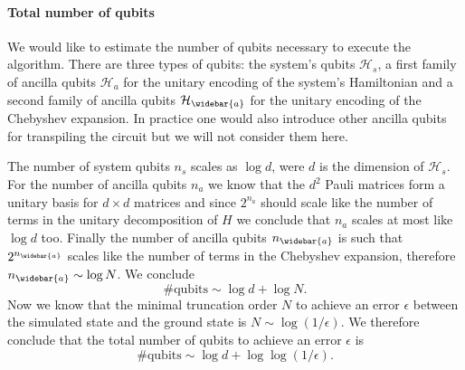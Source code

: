 \documentclass[a4paper,11pt]{article}
\begin{document}
\paragraph{Total number of qubits} We would like to estimate the number of qubits necessary to execute the algorithm. There are three types of qubits: the system's qubits $\mathcal{H}_s$, a first family of ancilla qubits $\mathcal{H}_a$ for the unitary encoding of the system's Hamiltonian and a second family of ancilla qubits $\mathcal{H}_{\widebar{a}}$ for the unitary encoding of the Chebyshev expansion. In practice one would also introduce other ancilla qubits for transpiling the circuit but we will not consider them here. 

The number of system qubits $n_s$ scales as $\log d$, were $d$ is the dimension of $\mathcal{H}_s$. For the number of ancilla qubits $n_a$ we know that the $d^2$ Pauli matrices form a unitary basis for $d\times d$ matrices and since $2^{n_a}$ should scale like the number of terms in the unitary decomposition of $H$ we conclude that $n_a$ scales at most like $\log d$ too. Finally the number of ancilla qubits $n_{\widebar{a}}$ is such that $2^{n_{\widebar{a}}}$ scales like the number of terms in the Chebyshev expansion, therefore $n_{\widebar{a}}\sim \log N$. We conclude 
\begin{equation}
    \#\mathrm{qubits} \sim \log d + \log N.
\end{equation}
Now we know that the minimal truncation order $N$ to achieve an error $\epsilon$ between the simulated state and the ground state is $N \sim \log(1/\epsilon)$. We therefore conclude that the total number of qubits to achieve an error $\epsilon$ is 
\begin{equation}
    \#\mathrm{qubits} \sim \log d + \log \log(1/\epsilon).
\end{equation}
\end{document}
